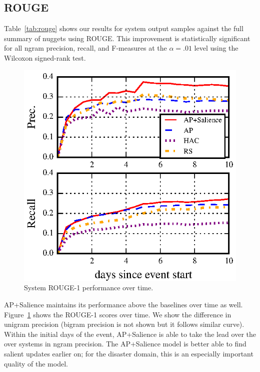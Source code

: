 
\subsection{ROUGE}


Table~\ref{tab:rouge} shows our results for system output samples against the full summary of nuggets using ROUGE. 
This improvement is statistically significant for all ngram
precision, recall, and F-measures
at the $\alpha = .01$ level
using the Wilcoxon signed-rank test. 

\begin{figure}
    \includegraphics[]{rouge-time.eps}
\caption{System ROUGE-1 performance over time.}
\label{fig:trouge}
\end{figure}


AP+Salience maintains its performance above the baselines over time as well. Figure~\ref{fig:trouge}
shows the ROUGE-1 scores over time. 
We show the difference in unigram precision (bigram precision is not shown but it follows
similar curve).
Within the initial days of the event, AP+Salience is able to take the lead over the over 
systems in ngram precision. 
The AP+Salience model is better able to find salient updates
earlier on; for the disaster domain, this is an especially important quality of the model. 

